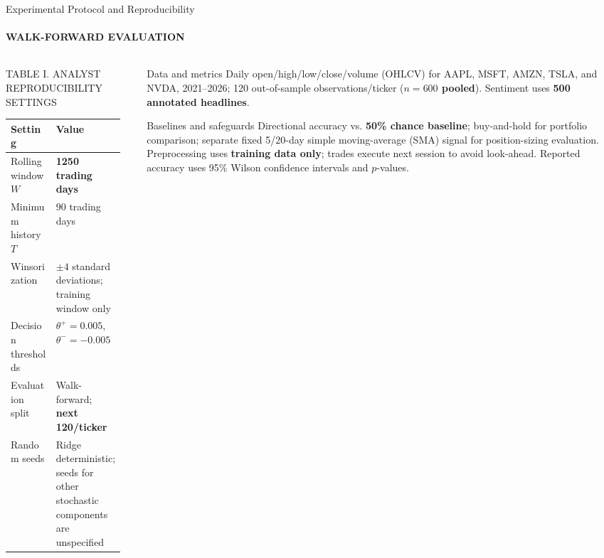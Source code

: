 \documentclass[aspectratio=169,11pt]{beamer}
\newcommand{\keyphrase}[1]{\textbf{\color{DELCONred}#1}}
\begin{document}
\begin{frame}{Experimental Protocol and Reproducibility}
  \framesubtitle{WALK-FORWARD EVALUATION}
  \begin{columns}[T,onlytextwidth]
    \begin{column}{0.56\textwidth}
      \begin{block}{TABLE I. ANALYST REPRODUCIBILITY SETTINGS}
        \centering\scriptsize
        \setlength{\tabcolsep}{3pt}\begin{tabular}{p{0.36\linewidth}p{0.55\linewidth}}
          \toprule
          Setting & Value \\
          \midrule
          Rolling window $W$ & \keyphrase{1250 trading days} \\
          Minimum history $T$ & 90 trading days \\
          Winsorization & $\pm4$ standard deviations; training window only \\
          Decision thresholds & $\theta^+=0.005$, $\theta^-=-0.005$ \\
          Evaluation split & Walk-forward; \keyphrase{next 120/ticker} \\
          Random seeds & Ridge deterministic; seeds for other stochastic components are unspecified \\
          \bottomrule
        \end{tabular}
      \end{block}
    \end{column}
    \begin{column}{0.41\textwidth}
      \begin{block}{Data and metrics}
        \scriptsize Daily open/high/low/close/volume (OHLCV) for AAPL, MSFT, AMZN, TSLA, and NVDA, 2021--2026; 120 out-of-sample observations/ticker (\keyphrase{$n=600$ pooled}). Sentiment uses \keyphrase{500 annotated headlines}.
      \end{block}
      \begin{block}{Baselines and safeguards}
        \scriptsize Directional accuracy vs. \keyphrase{50\% chance baseline}; buy-and-hold for portfolio comparison; separate fixed 5/20-day simple moving-average (SMA) signal for position-sizing evaluation. Preprocessing uses \keyphrase{training data only}; trades execute next session to avoid look-ahead. Reported accuracy uses 95\% Wilson confidence intervals and $p$-values.
      \end{block}
    \end{column}
  \end{columns}
\end{frame}
\end{document}
